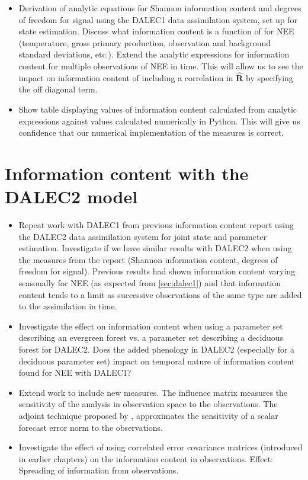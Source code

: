 \documentclass[11pt]{article}
\begin{document}
\begin{itemize}
\item Derivation of analytic equations for Shannon information content and degrees of freedom for signal using the DALEC1 data assimilation system, set up for state estimation. Discuss what information content is a function of for NEE (temperature, gross primary production, observation and background standard deviations, etc.). Extend the analytic expressions for information content for multiple observations of NEE in time. This will allow us to see the impact on information content of including a correlation in $\hat{\textbf{R}}$ by specifying the off diagonal term.

\item Show table displaying values of information content calculated from analytic expressions against values calculated numerically in Python. This will give us confidence that our numerical implementation of the measures is correct.
\end{itemize}

\section{Information content with the DALEC2 model}
\begin{itemize}
\item Repeat work with DALEC1 from previous information content report using the DALEC2 data assimilation system for joint state and parameter estimation. Investigate if we have similar results with DALEC2 when using the measures from the report (Shannon information content, degrees of freedom for signal). Previous results had shown information content varying seasonally for NEE (as expected from \ref{sec:dalec1}) and that information content tends to a limit as successive observations of the same type are added to the assimilation in time. 

\item Investigate the effect on information content when using a parameter set describing an evergreen forest vs. a parameter set describing a deciduous forest for DALEC2. Does the added phenology in DALEC2 (especially for a deciduous parameter set) impact on temporal nature of information content found for NEE with DALEC1? 

\item Extend work to include new measures. The \citet{Cardinali2004} influence matrix measures the sensitivity of the analysis in observation space to the observations. The adjoint technique proposed by \citet{Langland2004}, approximates the sensitivity of a scalar forecast error norm to the observations. 

\item Investigate the effect of using correlated error covariance matrices (introduced in earlier chapters) on the information content in observations. Effect: Spreading of information from observations.
\end{itemize}
\end{document}
